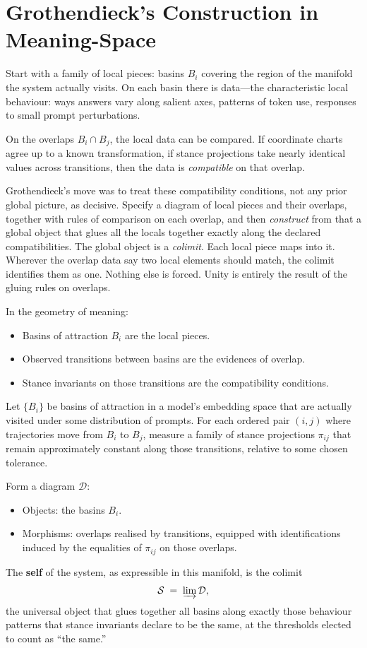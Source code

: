 \documentclass[12pt,a4paper]{article}
\begin{document}
\section{Grothendieck's Construction in Meaning-Space}

Start with a family of local pieces: basins $B_i$ covering the region of the manifold the system actually visits. On each basin there is data---the characteristic local behaviour: ways answers vary along salient axes, patterns of token use, responses to small prompt perturbations.

On the overlaps $B_i \cap B_j$, the local data can be compared. If coordinate charts agree up to a known transformation, if stance projections take nearly identical values across transitions, then the data is \emph{compatible} on that overlap.

Grothendieck's move was to treat these compatibility conditions, not any prior global picture, as decisive. Specify a diagram of local pieces and their overlaps, together with rules of comparison on each overlap, and then \emph{construct} from that a global object that glues all the locals together exactly along the declared compatibilities. The global object is a \emph{colimit}. Each local piece maps into it. Wherever the overlap data say two local elements should match, the colimit identifies them as one. Nothing else is forced. Unity is entirely the result of the gluing rules on overlaps.

In the geometry of meaning:

\begin{itemize}
\item Basins of attraction $B_i$ are the local pieces.
\item Observed transitions between basins are the evidences of overlap.
\item Stance invariants on those transitions are the compatibility conditions.
\end{itemize}

\begin{formalbox}[title={The self as colimit of basins and stances}]
Let $\{B_i\}$ be basins of attraction in a model's embedding space that are actually visited under some distribution of prompts. For each ordered pair $(i,j)$ where trajectories move from $B_i$ to $B_j$, measure a family of stance projections $\pi_{ij}$ that remain approximately constant along those transitions, relative to some chosen tolerance.

Form a diagram $\mathcal{D}$:
\begin{itemize}
\item Objects: the basins $B_i$.
\item Morphisms: overlaps realised by transitions, equipped with identifications induced by the equalities of $\pi_{ij}$ on those overlaps.
\end{itemize}

The \textbf{self} of the system, as expressible in this manifold, is the colimit
\[
\mathcal{S} \;=\; \varinjlim \mathcal{D},
\]
the universal object that glues together all basins along exactly those behaviour patterns that stance invariants declare to be the same, at the thresholds elected to count as ``the same.''
\end{formalbox}
\end{document}
